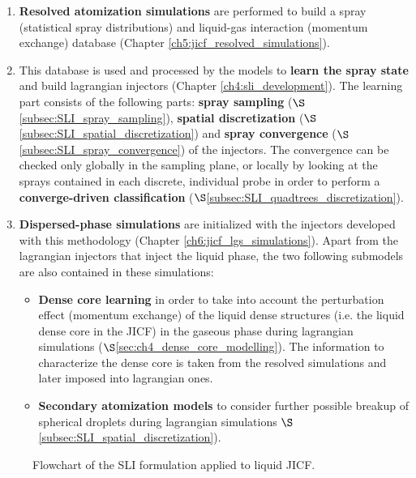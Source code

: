 \begin{enumerate}

	\item \textbf{Resolved atomization simulations} are performed to build a spray (statistical spray distributions) and liquid-gas interaction (momentum exchange) database (Chapter \ref{ch5:jicf_resolved_simulations}).
	
	\item This database is used and processed by the models to \textbf{learn the spray state} and build lagrangian injectors (Chapter \ref{ch4:sli_development}). The learning part consists of the following parts: \textbf{spray sampling} ($\S$\ref{subsec:SLI_spray_sampling}), \textbf{spatial discretization} ($\S$\ref{subsec:SLI_spatial_discretization}) and \textbf{spray convergence} ($\S$\ref{subsec:SLI_spray_convergence}) of the injectors. The convergence can be checked only globally in the sampling plane, or locally by looking at the sprays contained in each discrete, individual probe in order to perform a \textbf{converge-driven classification} ($\S$\ref{subsec:SLI_quadtrees_discretization}).
	
	\item \textbf{Dispersed-phase simulations} are initialized with the injectors developed with this methodology (Chapter \ref{ch6:jicf_lgs_simulations}). Apart from the lagrangian injectors that inject the liquid phase, the two following submodels are also contained in these simulations: 
	
		\begin{itemize}
	
		\item \textbf{Dense core learning} in order to take into account the perturbation effect (momentum exchange) of the liquid dense structures (i.e. the liquid dense core in the JICF) in the gaseous phase during lagrangian simulations ($\S$\ref{sec:ch4_dense_core_modelling}). The information to characterize the dense core is taken from the resolved simulations and later imposed into lagrangian ones.
		
		\item \textbf{Secondary atomization models} to consider further possible breakup of spherical droplets during lagrangian simulations $\S$\ref{subsec:SLI_spatial_discretization}).
		
		\end{itemize}


\end{enumerate}


\begin{figure}[h!]	
	\centering
	\caption{Flowchart of the SLI formulation applied to liquid JICF.}
	\label{fig:SLI_graphic_description}
\end{figure}


